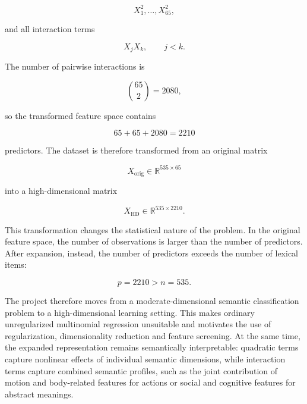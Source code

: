 \documentclass{ipgpmaster}
\begin{document}
\[
X_1^2,\ldots,X_{65}^2,
\]

and all interaction terms

\[
X_jX_k, \qquad j<k.
\]

The number of pairwise interactions is

\[
\binom{65}{2} = 2080,
\]

so the transformed feature space contains

\[
65 + 65 + 2080 = 2210
\]

predictors. The dataset is therefore transformed from an original matrix

\[
X_{\text{orig}} \in \mathbb{R}^{535 \times 65}
\]

into a high-dimensional matrix

\[
X_{\text{HD}} \in \mathbb{R}^{535 \times 2210}.
\]

This transformation changes the statistical nature of the problem. In the original feature space, the number of observations is larger than the number of predictors. After expansion, instead, the number of predictors exceeds the number of lexical items:

\[
p = 2210 > n = 535.
\]

The project therefore moves from a moderate-dimensional semantic classification problem to a high-dimensional learning setting. This makes ordinary unregularized multinomial regression unsuitable and motivates the use of regularization, dimensionality reduction and feature screening. At the same time, the expanded representation remains semantically interpretable: quadratic terms capture nonlinear effects of individual semantic dimensions, while interaction terms capture combined semantic profiles, such as the joint contribution of motion and body-related features for actions or social and cognitive features for abstract meanings.
\end{document}
